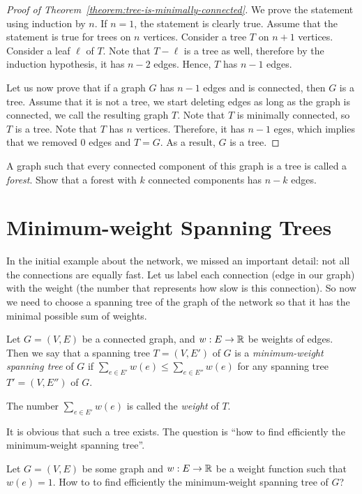 \begin{proof}[Proof of Theorem~\ref{theorem:tree-is-minimally-connected}]
  We prove the statement using induction by $n$. If $n = 1$, the statement is
  clearly true.
  Assume that the statement is true for trees on $n$ vertices. Consider a tree
  $T$ on $n + 1$ vertices. Consider a leaf $\ell$ of $T$. Note that $T - \ell$
  is a tree as well, therefore by the induction hypothesis, it has $n - 2$
  edges. Hence, $T$ has $n - 1$ edges.

  Let us now prove that if a graph $G$ has $n - 1$ edges and is connected,
  then $G$ is a tree. Assume that it is not a tree, we start deleting edges as
  long as the graph is connected, we call the resulting graph $T$. Note that
  $T$ is minimally connected, so $T$ is a tree. Note that $T$ has $n$ vertices.
  Therefore, it has $n - 1$ eges, which implies that we removed $0$ edges and
  $T = G$. As a result, $G$ is a tree.
\end{proof}

\begin{exercise}
  A graph such that every connected component of this graph is a tree is called
  a \emph{forest}.
  Show that a forest with $k$ connected components has $n - k$ edges.
\end{exercise}

\section{Minimum-weight Spanning Trees}
In the initial example about the network, we missed an important detail: not
all the connections are equally fast. Let us label each connection
(edge in our graph) with the weight (the number that represents how slow is this
connection). So now we need to choose a spanning tree of
the graph of the network so that it has the minimal possible sum of weights.
\begin{definition}
  Let $G = (V, E)$ be a connected graph, and $w : E \to \mathbb{R}$ be weights of edges.
  Then we say that a spanning tree $T = (V, E')$ of $G$ is a
  \emph{minimum-weight spanning tree} of $G$ if
  $\sum_{e \in E'} w(e) \le \sum_{e \in E''} w(e)$ for any spanning tree
  $T' = (V, E'')$ of $G$.

  The number $\sum_{e \in E'} w(e)$ is called the \emph{weight} of $T$.
\end{definition}

It is obvious that such a tree exists. The question is
``how to find efficiently the minimum-weight spanning tree''.
\begin{exercise}
  Let $G = (V, E)$ be some graph and $w : E \to \mathbb{R}$ be a weight function such
  that $w(e) = 1$. How to to find efficiently the minimum-weight spanning tree
  of $G$?
\end{exercise}


